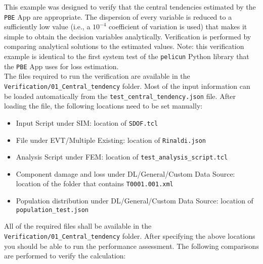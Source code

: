 This example was designed to verify that the central tendencies estimated by the \texttt{PBE} App are appropriate. The dispersion of every variable is reduced to a sufficiently low value (i.e., a $10^{-4}$ coefficient of variation is used) that makes it simple to obtain the decision variables analytically. Verification is performed by comparing analytical solutions to the estimated values. Note: this verification example is identical to the first system test of the \texttt{pelicun} Python library that the \texttt{PBE} App uses for loss estimation.\\

The files required to run the verification are available in the \texttt{Verification/01\_Central\_tendency} folder. Most of the input information can be loaded automatically from the \texttt{test\_central\_tendency.json} file. After loading the file, the following locations need to be set manually:

\begin{itemize}
    \item Input Script under SIM: location of \texttt{SDOF.tcl}
    \item File under EVT/Multiple Existing: location of \texttt{Rinaldi.json}
    \item Analysis Script under FEM: location of \texttt{test\_analysis\_script.tcl}
    \item Component damage and loss under DL/General/Custom Data Source: location of the folder that contains \texttt{T0001.001.xml}
    \item Population distribution under DL/General/Custom Data Source: location of \texttt{population\_test.json}
\end{itemize}

All of the required files shall be available in the \texttt{Verification/01\_Central\_tendency} folder. After specifying the above locations you should be able to run the performance assessment. The following comparisons are performed to verify the calculation:


